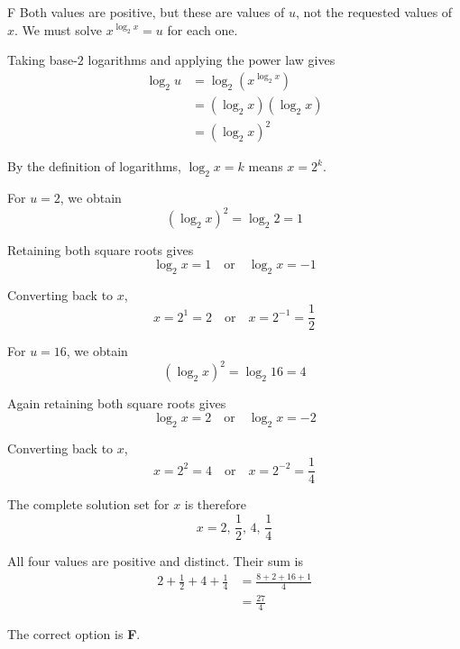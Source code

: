 \documentclass[11pt,a4paper]{article}
\begin{document}
\begin{enumerate}[label=\textbf{\arabic*.},leftmargin=*,itemsep=0pt,start=6]
\begin{djsSolution}{F}
Both values are positive, but these are values of $u$, not the requested values of $x$. We must solve $x^{\log_2x}=u$ for each one.

Taking base-$2$ logarithms and applying the power law gives
\[
\begin{aligned}
\log_2u&=\log_2\left(x^{\log_2x}\right)\\[5pt]
&=(\log_2x)(\log_2x)\\[5pt]
&=(\log_2x)^2
\end{aligned}
\]

By the definition of logarithms, $\log_2x=k$ means $x=2^k$.

For $u=2$, we obtain
\[
(\log_2x)^2=\log_2 2=1
\]

Retaining both square roots gives
\[
\log_2x=1\quad\text{or}\quad\log_2x=-1
\]

Converting back to $x$,
\[
x=2^1=2\quad\text{or}\quad x=2^{-1}=\frac12
\]

For $u=16$, we obtain
\[
(\log_2x)^2=\log_2 16=4
\]

Again retaining both square roots gives
\[
\log_2x=2\quad\text{or}\quad\log_2x=-2
\]

Converting back to $x$,
\[
x=2^2=4\quad\text{or}\quad x=2^{-2}=\frac14
\]

The complete solution set for $x$ is therefore 
\[
\boxed{x = 2,\,\frac12,\,4,\,\frac14}
\]

All four values are positive and distinct. Their sum is
\[
\begin{aligned}
2+\frac12+4+\frac14
&=\frac{8+2+16+1}{4}\\[8pt]
&=\frac{27}{4}
\end{aligned}
\]

The correct option is \textbf{F}.
\end{djsSolution}
\end{enumerate}
\clearpage
\thispagestyle{djssolutions}
\vspace*{8pt}
\end{document}
